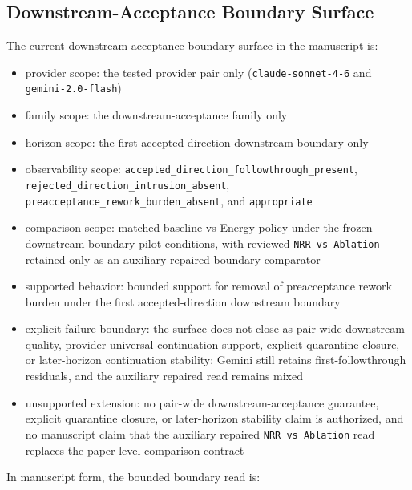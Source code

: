 \documentclass[11pt]{article}
\begin{document}
\subsection{Downstream-Acceptance Boundary Surface}

The current downstream-acceptance boundary surface in the manuscript is:

\begin{itemize}
\item provider scope:
  the tested provider pair only (\texttt{claude-sonnet-4-6} and
  \texttt{gemini-2.0-flash})
\item family scope:
  the downstream-acceptance family only
\item horizon scope:
  the first accepted-direction downstream boundary only
\item observability scope:
  \texttt{accepted\_direction\_followthrough\_present},
  \texttt{rejected\_direction\_intrusion\_absent},
  \texttt{preacceptance\_rework\_burden\_absent}, and \texttt{appropriate}
\item comparison scope:
  matched baseline vs Energy-policy under the frozen downstream-boundary pilot
  conditions, with reviewed \texttt{NRR vs Ablation} retained only as an
  auxiliary repaired boundary comparator
\item supported behavior:
  bounded support for removal of preacceptance rework burden under the first
  accepted-direction downstream boundary
\item explicit failure boundary:
  the surface does not close as pair-wide downstream quality, provider-universal
  continuation support, explicit quarantine closure, or later-horizon
  continuation stability; Gemini still retains first-followthrough residuals,
  and the auxiliary repaired read remains mixed
\item unsupported extension:
  no pair-wide downstream-acceptance guarantee, explicit quarantine closure, or
  later-horizon stability claim is authorized, and no manuscript claim that the
  auxiliary repaired \texttt{NRR vs Ablation} read replaces the paper-level
  comparison contract
\end{itemize}

In manuscript form, the bounded boundary read is:
\end{document}
